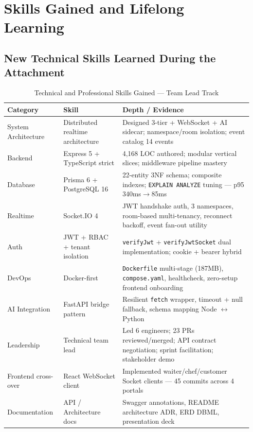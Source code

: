 \chapter{Skills Gained and Lifelong Learning}
\label{ch:skills}

\section{New Technical Skills Learned During the Attachment}

\begin{table}[H]
\centering
\caption{Technical and Professional Skills Gained --- Team Lead Track}
\label{tab:skills}
\small
\begin{tabularx}{\textwidth}{@{}p{}p{}X@{}}
\toprule
\textbf{Category} & \textbf{Skill} & \textbf{Depth / Evidence} \\
\midrule
System Architecture & Distributed realtime architecture & Designed 3-tier + WebSocket + AI sidecar; namespace/room isolation; event catalog 14 events \\
Backend & Express 5 + TypeScript strict & 4,168 LOC authored; modular vertical slices; middleware pipeline mastery \\
Database & Prisma 6 + PostgreSQL 16 & 22-entity 3NF schema; composite indexes; \texttt{EXPLAIN ANALYZE} tuning --- p95 340ms$\rightarrow$85ms \\
Realtime & Socket.IO 4 & JWT handshake auth, 3 namespaces, room-based multi-tenancy, reconnect backoff, event fan-out utility \\
Auth & JWT + RBAC + tenant isolation & \texttt{verifyJwt} + \texttt{verifyJwtSocket} dual implementation; cookie + bearer hybrid \\
DevOps & Docker-first & \texttt{Dockerfile} multi-stage (187MB), \texttt{compose.yaml}, healthcheck, zero-setup frontend onboarding \\
AI Integration & FastAPI bridge pattern & Resilient \texttt{fetch} wrapper, timeout + null fallback, schema mapping Node $\leftrightarrow$ Python \\
Leadership & Technical team lead & Led 6 engineers; 23 PRs reviewed/merged; API contract negotiation; sprint facilitation; stakeholder demo \\
Frontend cross-over & React WebSocket client & Implemented waiter/chef/customer Socket clients --- 45 commits across 4 portals \\
Documentation & API / Architecture docs & Swagger annotations, README architecture ADR, ERD DBML, presentation deck \\
\bottomrule
\end{tabularx}
\end{table}

